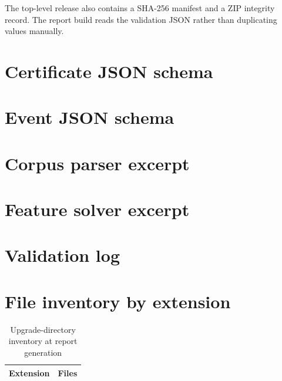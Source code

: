 \documentclass[11pt,a4paper,oneside]{book}
\begin{document}
The top-level release also contains a SHA-256 manifest and a ZIP integrity record. The report build reads the validation JSON rather than duplicating values manually.

\chapter{Certificate JSON schema}


\chapter{Event JSON schema}


\chapter{Corpus parser excerpt}


\chapter{Feature solver excerpt}


\chapter{Validation log}


\chapter{File inventory by extension}
\begin{table}[H]
\centering
\caption{Upgrade-directory inventory at report generation}
\begin{tabular}{lr}
\toprule
Extension & Files\\
\midrule

\bottomrule
\end{tabular}
\end{table}
\end{document}
